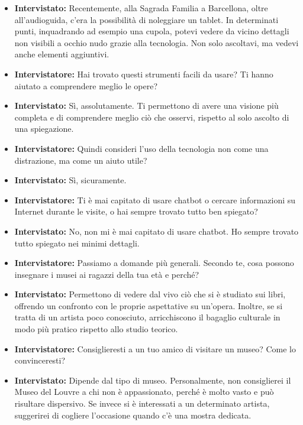 \documentclass{article}
\begin{document}
\begin{itemize}
    \item \textbf{Intervistato:} Recentemente, alla Sagrada Familia a Barcellona, oltre all’audioguida, c’era la possibilità di noleggiare un tablet. In determinati punti, inquadrando ad esempio una cupola, potevi vedere da vicino dettagli non visibili a occhio nudo grazie alla tecnologia. Non solo ascoltavi, ma vedevi anche elementi aggiuntivi.
    
    \item \textbf{Intervistatore:} Hai trovato questi strumenti facili da usare? Ti hanno aiutato a comprendere meglio le opere?
    
    \item \textbf{Intervistato:} Sì, assolutamente. Ti permettono di avere una visione più completa e di comprendere meglio ciò che osservi, rispetto al solo ascolto di una spiegazione.
    
    \item \textbf{Intervistatore:} Quindi consideri l’uso della tecnologia non come una distrazione, ma come un aiuto utile?
    
    \item \textbf{Intervistato:} Sì, sicuramente.
    
    \item \textbf{Intervistatore:} Ti è mai capitato di usare chatbot o cercare informazioni su Internet durante le visite, o hai sempre trovato tutto ben spiegato?
    
    \item \textbf{Intervistato:} No, non mi è mai capitato di usare chatbot. Ho sempre trovato tutto spiegato nei minimi dettagli.
    
    \item \textbf{Intervistatore:} Passiamo a domande più generali. Secondo te, cosa possono insegnare i musei ai ragazzi della tua età e perché?
    
    \item \textbf{Intervistato:} Permettono di vedere dal vivo ciò che si è studiato sui libri, offrendo un confronto con le proprie aspettative su un’opera. Inoltre, se si tratta di un artista poco conosciuto, arricchiscono il bagaglio culturale in modo più pratico rispetto allo studio teorico.
    
    \item \textbf{Intervistatore:} Consiglieresti a un tuo amico di visitare un museo? Come lo convinceresti?
    
    \item \textbf{Intervistato:} Dipende dal tipo di museo. Personalmente, non consiglierei il Museo del Louvre a chi non è appassionato, perché è molto vasto e può risultare dispersivo. Se invece si è interessati a un determinato artista, suggerirei di cogliere l’occasione quando c’è una mostra dedicata.
    

\end{itemize}
\end{document}
